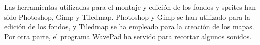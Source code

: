 Las herramientas utilizadas para el montaje y edición de los fondos y sprites han sido Photoshop, Gimp y Tiledmap. Photoshop y Gimp se han utilizado para la edición de los fondos, y Tiledmap se ha empleado para la creación de los mapas. Por otra parte, el programa WavePad ha servido para recortar algunos sonidos.



